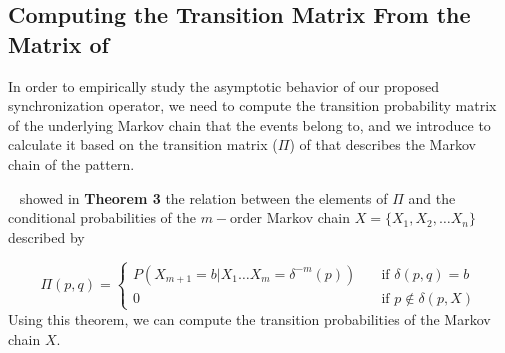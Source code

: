 






 
\subsection{Computing the Transition Matrix From the Matrix of \pmcmr }

\par In order to empirically study the asymptotic behavior of our proposed synchronization operator, we need to compute the transition probability matrix of the underlying Markov chain that the events belong to, and we introduce to calculate it  based on the transition matrix ($\Pi$) of \pmcmr that describes the Markov chain of the pattern.

~\citet{nuel_pattern_2008} showed in \textbf{Theorem 3} the relation between the elements  of 
$\Pi$ and the conditional probabilities of the $m-$order Markov chain $X=\{X_1, X_2, \ldots X_n\}$ described by 

\[ \Pi(p, q) =
\begin{cases}
P(X_{m+1}=b|X_1\ldots X_m=\delta^{-m}(p))       & \quad \text{if } \delta(p,q)=b \\
0  & \quad \text{if } p \notin  \delta(p,X)
\end{cases}
\]
Using this theorem, we can compute the transition probabilities of the Markov chain $X$.

